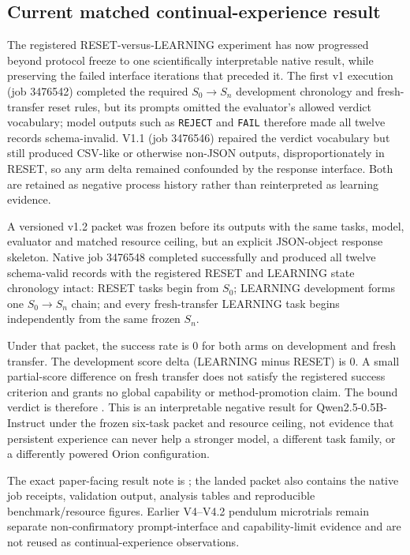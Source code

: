 \subsection{Current matched continual-experience result}

The registered RESET-versus-LEARNING experiment has now progressed beyond protocol freeze to one scientifically interpretable native result, while preserving the failed interface iterations that preceded it.  The first v1 execution (job 3476542) completed the required $S_0\rightarrow S_n$ development chronology and fresh-transfer reset rules, but its prompts omitted the evaluator's allowed verdict vocabulary; model outputs such as \texttt{REJECT} and \texttt{FAIL} therefore made all twelve records schema-invalid.  V1.1 (job 3476546) repaired the verdict vocabulary but still produced CSV-like or otherwise non-JSON outputs, disproportionately in RESET, so any arm delta remained confounded by the response interface.  Both are retained as negative process history rather than reinterpreted as learning evidence.

A versioned v1.2 packet was frozen before its outputs with the same
tasks, model, evaluator and matched resource ceiling, but an explicit
JSON-object response skeleton.  Native job 3476548 completed successfully
and produced all twelve schema-valid records with the registered RESET and
LEARNING state chronology intact: RESET tasks begin from $S_0$; LEARNING
development forms one $S_0\rightarrow S_n$ chain; and every fresh-transfer
LEARNING task begins independently from the same frozen $S_n$.

Under that packet, the success rate is 0 for both arms on development and
fresh transfer.  The development score delta (LEARNING minus RESET) is 0.
A small partial-score difference on fresh transfer does not satisfy the
registered success criterion and grants no global capability or
method-promotion claim.  The bound verdict is therefore
.
This is an interpretable negative result for Qwen2.5-0.5B-Instruct under
the frozen six-task packet and resource ceiling, not evidence that
persistent experience can never help a stronger model, a different task
family, or a differently powered Orion configuration.

The exact paper-facing result note is
;
the landed packet also contains the native job receipts, validation
output, analysis tables and reproducible benchmark/resource figures.
Earlier V4--V4.2 pendulum microtrials remain separate non-confirmatory
prompt-interface and capability-limit evidence and are not reused as
continual-experience observations.

